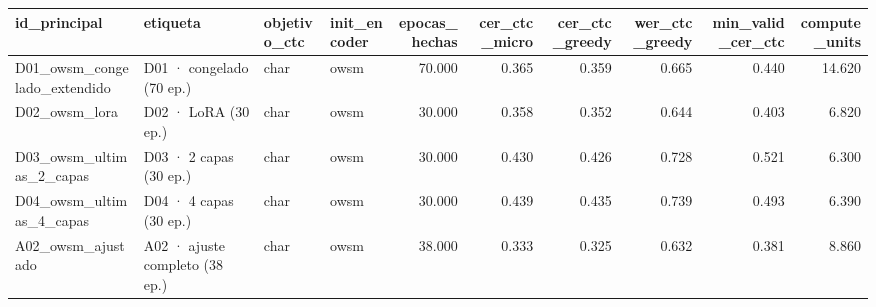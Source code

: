\begin{tabular}{llllrrrrrr}
\toprule
id_principal & etiqueta & objetivo_ctc & init_encoder & epocas_hechas & cer_ctc_micro & cer_ctc_greedy & wer_ctc_greedy & min_valid_cer_ctc & compute_units \\
\midrule
D01_owsm_congelado_extendido & D01 · congelado (70 ep.) & char & owsm & 70.000 & 0.365 & 0.359 & 0.665 & 0.440 & 14.620 \\
D02_owsm_lora & D02 · LoRA (30 ep.) & char & owsm & 30.000 & 0.358 & 0.352 & 0.644 & 0.403 & 6.820 \\
D03_owsm_ultimas_2_capas & D03 · 2 capas (30 ep.) & char & owsm & 30.000 & 0.430 & 0.426 & 0.728 & 0.521 & 6.300 \\
D04_owsm_ultimas_4_capas & D04 · 4 capas (30 ep.) & char & owsm & 30.000 & 0.439 & 0.435 & 0.739 & 0.493 & 6.390 \\
A02_owsm_ajustado & A02 · ajuste completo (38 ep.) & char & owsm & 38.000 & 0.333 & 0.325 & 0.632 & 0.381 & 8.860 \\
\bottomrule
\end{tabular}

